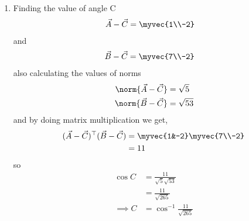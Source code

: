 \documentclass[11pt]{book}
\begin{document}
\begin{enumerate}[label=\thesection.\arabic*.,ref=\thesection.\theenumi]
\begin{enumerate}
\item Finding the value of angle C
\begin{align}
	\vec{A}-\vec{C} &=\myvec{1\\-2}
\end{align}
and 
\begin{align}
	\vec{B}-\vec{C}&= \myvec{7\\-2}
\end{align}
also calculating the values of norms
\begin{align}
	\norm{\vec{A}-\vec{C}} &= \sqrt{5}\\
	\norm{\vec{B}-\vec{C}} &= \sqrt{53}
\end{align}
and by doing matrix multiplication we get,
\begin{align}
\begin{split}
	(\vec{A}-\vec{C})^{\top}(\vec{B}-\vec{C})&=\myvec{1&-2}\myvec{7\\-2}\\
	&=11
\end{split}
\end{align}
so 
\begin{align}
	\cos{C}&= \frac{11}{\sqrt{5} \sqrt{53}}\\
	&= \frac{11}{\sqrt{265}}\\
	\implies C&=\cos^{-1}{\frac{11}{\sqrt{265}}}
\end{align}

\end{enumerate}


\end{enumerate}









%
\end{document}
